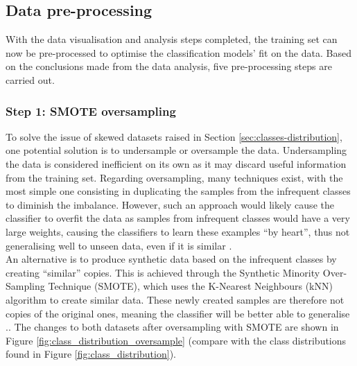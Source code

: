 \documentclass[letterpaper,12pt]{article}
\begin{document}

\subsection{Data pre-processing}
\label{sec:data-preprocessing-steps}

With the data visualisation and analysis steps completed, the training set can now be pre-processed to optimise the classification models’ fit on the data. Based on the conclusions made from the data analysis, five pre-processing steps are carried out.

\subsubsection{Step 1: SMOTE oversampling}

To solve the issue of skewed datasets raised in Section \ref{sec:classes-distribution}, one potential solution is to undersample or oversample the data. Undersampling the data is considered inefficient on its own as it may discard useful information from the training set. Regarding oversampling, many techniques exist, with the most simple one consisting in duplicating the samples from the infrequent classes to diminish the imbalance. However, such an approach would likely cause the classifier to overfit the data as samples from infrequent classes would have a very large weights, causing the classifiers to learn these examples ``by heart'', thus not generalising well to unseen data, even if it is similar \cite{becker2020}.\\

An alternative is to produce synthetic data based on the infrequent classes by creating ``similar'' copies. This is achieved through the Synthetic Minority Over-Sampling Technique (SMOTE), which uses the K-Nearest Neighbours (kNN) algorithm to create similar data. These newly created samples are therefore not copies of the original ones, meaning the classifier will be better able to generalise \cite{chawla2002smote}.. The changes to both datasets after oversampling with SMOTE are shown in Figure \ref{fig:class_distribution_oversample} (compare with the class distributions found in Figure \ref{fig:class_distribution}).
\end{document}
